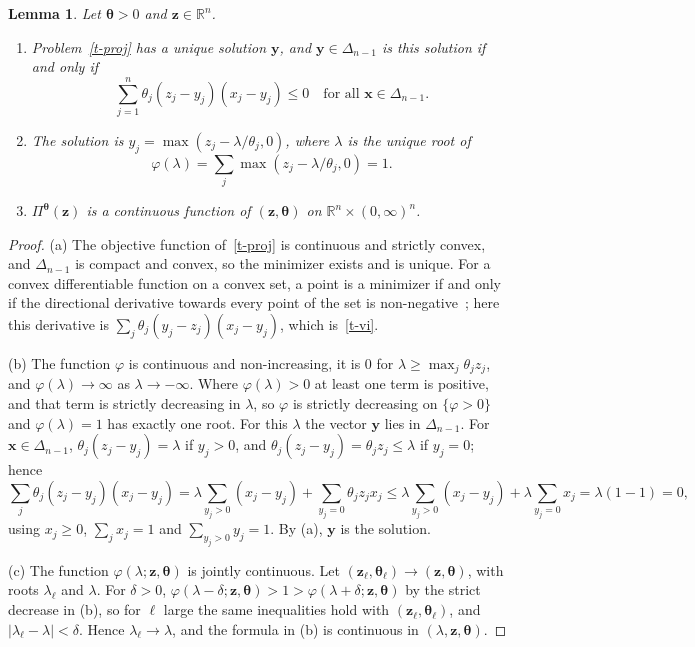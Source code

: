 \documentclass[11pt]{article}
\theoremstyle{plain}
\newtheorem{lemma}[theorem]{Lemma}
\theoremstyle{remark}
\numberwithin{equation}{section}
\begin{document}
\begin{lemma}\label{t-proj-prop}
Let $\bm\theta>0$ and $\bm z\in\mathbb{R}^n$.
\begin{enumerate}
\renewcommand{\labelenumi}{(\alph{enumi})}
\item Problem~\eqref{t-proj} has a unique solution $\bm y$, and
$\bm y\in\Delta_{n-1}$ is this solution if and only if
\begin{equation}\label{t-vi}
\sum_{j=1}^n \theta_j\left(z_j-y_j\right)\left(x_j-y_j\right)\le 0
\quad\text{for all }\bm x\in\Delta_{n-1}.
\end{equation}
\item The solution is $y_j=\max\left(z_j-\lambda/\theta_j,0\right)$, where
$\lambda$ is the unique root of
\begin{equation*}
\varphi(\lambda)=\sum_j\max\left(z_j-\lambda/\theta_j,0\right)=1 .
\end{equation*}
\item $\Pi^{\bm\theta}(\bm z)$ is a continuous function of $(\bm z,\bm\theta)$
on $\mathbb{R}^n\times(0,\infty)^n$.
\end{enumerate}
\end{lemma}
\begin{proof}
(a) The objective function of~\eqref{t-proj} is continuous and strictly convex,
and $\Delta_{n-1}$ is compact and convex, so the minimizer exists and is
unique. For a convex differentiable function on a convex set, a point is a
minimizer if and only if the directional derivative towards every point of the
set is non-negative~\cite[Section 4.2.3]{2004Boyd_Vandenberghe}; here this
derivative is $\sum_j \theta_j(y_j-z_j)(x_j-y_j)$, which is~\eqref{t-vi}.

(b) The function $\varphi$ is continuous and non-increasing, it is
$0$ for $\lambda\ge\max_j \theta_jz_j$, and $\varphi(\lambda)\to\infty$ as
$\lambda\to-\infty$. Where $\varphi(\lambda)>0$ at least one term is positive,
and that term is strictly decreasing in $\lambda$, so $\varphi$ is strictly
decreasing on $\{\varphi>0\}$ and $\varphi(\lambda)=1$ has exactly one root.
For this $\lambda$ the vector $\bm y$ lies in $\Delta_{n-1}$. For
$\bm x\in\Delta_{n-1}$, $\theta_j(z_j-y_j)=\lambda$ if $y_j>0$, and
$\theta_j(z_j-y_j)=\theta_jz_j\le\lambda$ if $y_j=0$; hence
\begin{equation}
\sum_j \theta_j(z_j-y_j)(x_j-y_j)
=\lambda\sum_{y_j>0}(x_j-y_j)+\sum_{y_j=0}\theta_jz_jx_j
\le\lambda\sum_{y_j>0}(x_j-y_j)+\lambda\sum_{y_j=0}x_j
=\lambda\left(1-1\right)=0,
\end{equation}
using $x_j\ge 0$, $\sum_jx_j=1$ and $\sum_{y_j>0}y_j=1$. By (a), $\bm y$ is the
solution.

(c) The function $\varphi(\lambda;\bm z,\bm\theta)$ is jointly continuous. Let
$(\bm z_\ell,\bm\theta_\ell)\to(\bm z,\bm\theta)$, with roots $\lambda_\ell$ and
$\lambda$. For $\delta>0$,
$\varphi(\lambda-\delta;\bm z,\bm\theta)>1>\varphi(\lambda+\delta;\bm z,\bm\theta)$
by the strict decrease in (b), so for $\ell$ large the same inequalities hold
with $(\bm z_\ell,\bm\theta_\ell)$, and $|\lambda_\ell-\lambda|<\delta$. Hence
$\lambda_\ell\to\lambda$, and the formula in (b) is continuous in
$(\lambda,\bm z,\bm\theta)$.
\end{proof}
\end{document}

